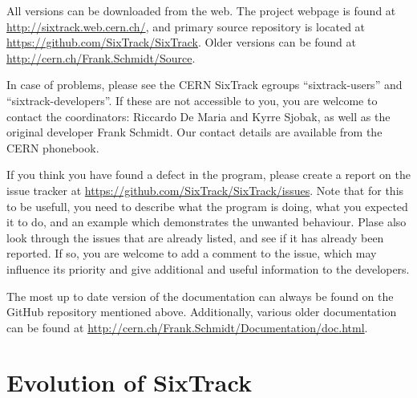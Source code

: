 All versions can be downloaded from the web.
The project webpage is found at \url{http://sixtrack.web.cern.ch/},
  and primary source repository is located at \url{https://github.com/SixTrack/SixTrack}.
Older versions can be found at \url{http://cern.ch/Frank.Schmidt/Source}.

In case of problems, please see the CERN SixTrack egroups ``sixtrack-users'' and ``sixtrack-developers''.
If these are not accessible to you, you are welcome to contact the coordinators: Riccardo De Maria and Kyrre Sjobak, as well as the original developer Frank Schmidt.
Our contact details are available from the CERN phonebook.

If you think you have found a defect in the program, please create a report on the issue tracker at \url{https://github.com/SixTrack/SixTrack/issues}.
Note that for this to be usefull, you need to describe what the program is doing, what you expected it to do, and an example which demonstrates the unwanted behaviour.
Plase also look through the issues that are already listed, and see if it has already been reported.
If so, you are welcome to add a comment to the issue, which may influence its priority and give additional and useful information to the developers.

The most up to date version of the documentation can always be found on the GitHub repository mentioned above.
Additionally, various older documentation can be found at \url{http://cern.ch/Frank.Schmidt/Documentation/doc.html}.

\section{Evolution of SixTrack}

